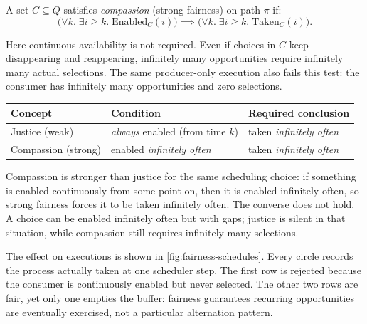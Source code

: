 \begin{definition}
\label{def:compassion}
A set $C \subseteq Q$ satisfies \emph{compassion} (strong fairness) on
path $\pi$ if:
\[
  \bigl(\forall k.\;\exists i \geq k.\;\mathrm{Enabled}_C(i)\bigr)
  \implies
  \bigl(\forall k.\;\exists i \geq k.\;\mathrm{Taken}_C(i)\bigr).
\]
\end{definition}

Here continuous availability is not required.  Even if choices in \(C\)
keep disappearing and reappearing, infinitely many opportunities require
infinitely many actual selections.  The same producer-only execution also
fails this test: the consumer has infinitely many opportunities and zero
selections.

\begin{center}
  \footnotesize
  \renewcommand{\arraystretch}{1.4}
  \begin{tabular}{@{}p{3cm}p{4.5cm}p{4.5cm}@{}}
    \toprule
    Concept & Condition & Required conclusion \\
    \midrule
    Justice (weak)     & \emph{always} enabled (from time $k$)  &
                         taken \emph{infinitely often} \\
    Compassion (strong)& enabled \emph{infinitely often}         &
                         taken \emph{infinitely often}           \\
    \bottomrule
  \end{tabular}
\end{center}

Compassion is stronger than justice for the same scheduling choice: if
something is enabled continuously from some point on, then it is enabled
infinitely often, so strong fairness forces it to be taken infinitely often.
The converse does not hold.  A choice can be enabled infinitely often but
with gaps; justice is silent in that situation, while compassion still
requires infinitely many selections.

The effect on executions is shown in
\cref{fig:fairness-schedules}.  Every circle records the process actually
taken at one scheduler step.  The first row is rejected because the consumer
is continuously enabled but never selected.  The other two rows are fair,
yet only one empties the buffer: fairness guarantees recurring opportunities
are eventually exercised, not a particular alternation pattern.

